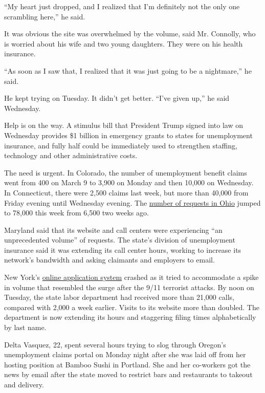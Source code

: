 ``My heart just dropped, and I realized that I'm definitely not the only
one scrambling here,'' he said.

It was obvious the site was overwhelmed by the volume, said Mr.
Connolly, who is worried about his wife and two young daughters. They
were on his health insurance.

``As soon as I saw that, I realized that it was just going to be a
nightmare,'' he said.

He kept trying on Tuesday. It didn't get better. ``I've given up,'' he
said Wednesday.

Help is on the way. A stimulus bill that President Trump signed into law
on Wednesday provides \$1 billion in emergency grants to states for
unemployment insurance, and fully half could be immediately used to
strengthen staffing, technology and other administrative costs.

The need is urgent. In Colorado, the number of unemployment benefit
claims went from 400 on March 9 to 3,900 on Monday and then 10,000 on
Wednesday. In Connecticut, there were 2,500 claims last week, but more
than 40,000 from Friday evening until Wednesday evening. The
\href{https://twitter.com/GovMikeDeWine/status/1240352256152809473?s=20}{number
of requests in Ohio} jumped to 78,000 this week from 6,500 two weeks
ago.

Maryland said that its website and call centers were experiencing ``an
unprecedented volume'' of requests. The state's division of unemployment
insurance said it was extending its call center hours, working to
increase its network's bandwidth and asking claimants and employers to
email.

New York's
\href{https://www.nytimes.com/2020/03/16/nyregion/coronavirus-new-york-update.html\#link-1c0b3898}{online
application system} crashed as it tried to accommodate a spike in volume
that resembled the surge after the 9/11 terrorist attacks. By noon on
Tuesday, the state labor department had received more than 21,000 calls,
compared with 2,000 a week earlier. Visits to its website more than
doubled. The department is now extending its hours and staggering filing
times alphabetically by last name.

Delta Vasquez, 22, spent several hours trying to slog through Oregon's
unemployment claims portal on Monday night after she was laid off from
her hosting position at Bamboo Sushi in Portland. She and her co-workers
got the news by email after the state moved to restrict bars and
restaurants to takeout and delivery.


